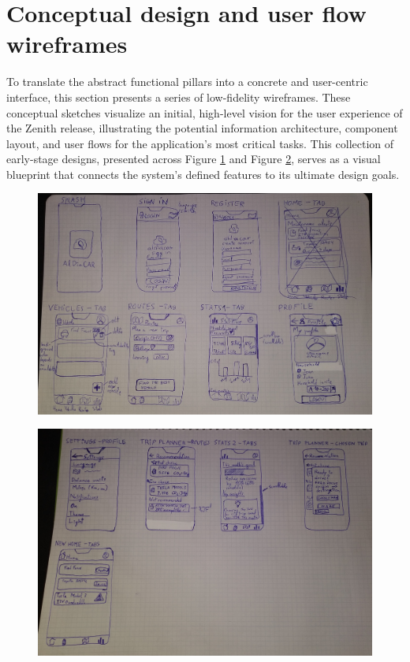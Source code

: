 \section{Conceptual design and user flow wireframes}
To translate the abstract functional pillars into a concrete and user-centric interface, this section presents a series of low-fidelity wireframes. These conceptual sketches visualize an initial, high-level vision for the user experience of the Zenith release, illustrating the potential information architecture, component layout, and user flows for the application's most critical tasks. This collection of early-stage designs, presented across Figure \ref{fig:sketches_part1} and Figure \ref{fig:sketches_part2}, serves as a visual blueprint that connects the system's defined features to its ultimate design goals.
\begin{figure}[H]
\centering
\includegraphics[width=\textwidth]{images/sketches/sketches-1.jpg}
\label{fig:sketches_part1}
\end{figure}

\begin{figure}[H]
\centering
\includegraphics[width=\textwidth]{images/sketches/sketches-2.jpg}
\label{fig:sketches_part2}
\end{figure}

